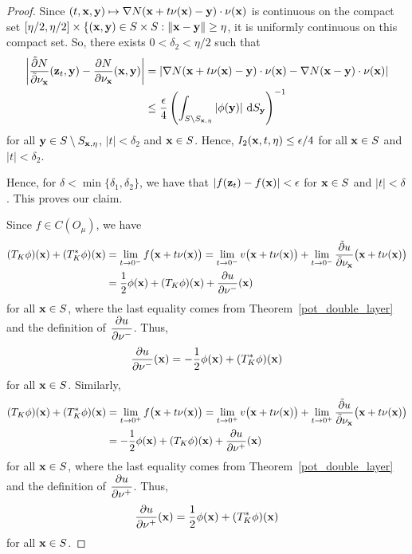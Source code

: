 \begin{proof}
 Since $\displaystyle (t,\mathbf{x},\mathbf{y}) \mapsto
\nabla N(\mathbf{x} + t \mathbf{\nu}(\mathbf{x}) - \mathbf{y}) \cdot \nu(\mathbf{x})$
is continuous on the compact set
$[\eta/2,\eta/2] \times \{(\mathbf{x},\mathbf{y}) \in S \times S :
\|\mathbf{x} - \mathbf{y}\| \geq \eta$,
it is uniformly continuous on this compact set.  So, there exists
$0 < \delta_2 < \eta/2$ such that
\begin{align*}
\left| \frac{\tilde{\partial}{N}}{\tilde{\partial}{\mathbf{\nu}_{\mathbf{x}}}}(\mathbf{z}_t,\mathbf{y}) -
\frac{\partial{N}}{\partial \mathbf{\nu}_{\mathbf{x}}}(\mathbf{x},\mathbf{y})\right|
&= \left| \nabla N(\mathbf{x} + t \mathbf{\nu}(\mathbf{x}) - \mathbf{y})
\cdot \mathbf{\nu}(\mathbf{x}) -
\nabla N(\mathbf{x} - \mathbf{y}) \cdot \mathbf{\nu}(\mathbf{x}) \right| \\
&\leq \frac{\epsilon}{4} \left(
\int_{S\setminus S_{\mathbf{x},\eta}}\left|\phi(\mathbf{y})\right|
\,\mathrm{d}{S}_{\mathbf{y}} \right)^{-1}
\end{align*}
for all $\displaystyle \mathbf{y} \in S \setminus S_{\mathbf{x},\eta}$,
$|t| < \delta_2$ and $\mathbf{x} \in S$.
Hence,
$\displaystyle I_2(\mathbf{x},t,\eta) \leq \epsilon/4$ for all $\mathbf{x} \in S$
and $|t| < \delta_2$.

 Hence, for $\delta < \min\{\delta_1,\delta_2\}$, we have
that 
$\displaystyle \left| f(\mathbf{z}_t) - f(\mathbf{x}) \right|< \epsilon$ for
$\mathbf{x} \in S$ and $|t|< \delta$.  This proves our claim.

 Since $f \in C(O_\mu)$, we have
\begin{align*}
(T_K \phi)(\mathbf{x}) + (T^\ast_K \phi)(\mathbf{x}) &=
\lim_{t\rightarrow 0^-} f\big(\mathbf{x}+t\mathbf{\nu}(\mathbf{x})\big)
= \lim_{t\rightarrow 0^-} v\big(\mathbf{x}+t\mathbf{\nu}(\mathbf{x})\big)
+ \lim_{t\rightarrow 0^-}
\frac{\tilde{\partial}{u}}{\tilde{\partial}{\mathbf{\nu}_{\mathbf{x}}}}\big(\mathbf{x}+t\mathbf{\nu}(\mathbf{x})\big) \\
&= \frac{1}{2} \phi(\mathbf{x}) + (T_K \phi)(\mathbf{x}) + 
\frac{\partial{u}}{\partial \mathbf{\nu}^-}(\mathbf{x})
\end{align*}
for all $\mathbf{x} \in S$, where the last equality comes from
Theorem~\ref{pot_double_layer} and the definition of
$\displaystyle \frac{\partial{u}}{\partial \mathbf{\nu}^-}$.  Thus,
\[
\frac{\partial{u}}{\partial \mathbf{\nu}^-}(\mathbf{x}) =
-\frac{1}{2} \phi(\mathbf{x}) + (T^\ast_K \phi)(\mathbf{x})
\]
for all $\mathbf{x} \in S$.  Similarly,
\begin{align*}
(T_K \phi)(\mathbf{x}) + (T^\ast_K \phi)(\mathbf{x}) &=
\lim_{t\rightarrow 0^+} f\big(\mathbf{x}+t\mathbf{\nu}(\mathbf{x})\big)
= \lim_{t\rightarrow 0^+} v\big(\mathbf{x}+t\mathbf{\nu}(\mathbf{x})\big)
+ \lim_{t\rightarrow 0^+}
\frac{\tilde{\partial}{u}}{\tilde{\partial}{\mathbf{\nu}_{\mathbf{x}}}}\big(\mathbf{x}+t\mathbf{\nu}(\mathbf{x})\big) \\
&= -\frac{1}{2} \phi(\mathbf{x}) + (T_K \phi)(\mathbf{x}) + 
\frac{\partial{u}}{\partial \mathbf{\nu}^+}(\mathbf{x})
\end{align*}
for all $\mathbf{x} \in S$, where the last equality comes from
Theorem~\ref{pot_double_layer} and the definition of
$\displaystyle \frac{\partial{u}}{\partial \mathbf{\nu}^+}$.  Thus,
\[
\frac{\partial{u}}{\partial \mathbf{\nu}^+}(\mathbf{x}) =
\frac{1}{2} \phi(\mathbf{x}) + (T^\ast_K \phi)(\mathbf{x})
\]
for all $\mathbf{x} \in S$.


\end{proof}
